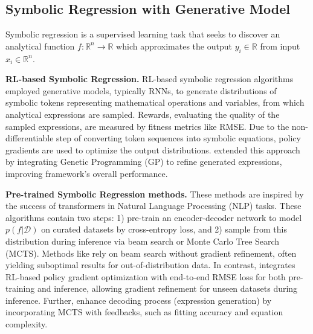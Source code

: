 \subsection{Symbolic Regression with Generative Model}
\label{subsec:sr-work}
Symbolic regression is a supervised learning task that seeks to discover an analytical function $f: \mathbb{R}^n \to \mathbb{R}$ which approximates the output $y_i \in \mathbb{R}$ from input $x_i \in \mathbb{R}^n$.


\textbf{RL-based Symbolic Regression.} 
RL-based symbolic regression algorithms 
\citep{dso, 2020costa, dso21} employed generative models, typically RNNs, to generate distributions of symbolic tokens representing mathematical operations and variables, from which analytical expressions are sampled. Rewards, evaluating the quality of the sampled expressions, are measured by fitness metrics like RMSE. Due to the non-differentiable step of converting token sequences into symbolic equations, policy gradients are used to optimize the output distributions. \citet{rlgp2021} extended this approach by integrating Genetic Programming (GP) to refine generated expressions, improving framework's overall performance.


\textbf{Pre-trained Symbolic Regression methods.} 
These methods are inspired by the success of transformers in Natural Language Processing (NLP) tasks. These algorithms contain two steps: 1) pre-train an encoder-decoder network to model $p(f|\mathcal{D})$ on curated datasets by cross-entropy loss, and 2) sample from this distribution during inference via beam search or Monte Carlo Tree Search (MCTS). Methods like \citep{NSR, E2E, NSRwH} rely on beam search without gradient refinement, often yielding suboptimal results for out-of-distribution data. In contrast, \citet{dgsr} integrates RL-based policy gradient optimization with end-to-end RMSE loss for both pre-training and inference, allowing gradient refinement for unseen datasets during inference. Further, \citep{tpsr, dgsr-mcts} enhance decoding process (expression generation) by incorporating MCTS with feedbacks, such as fitting accuracy and equation complexity.